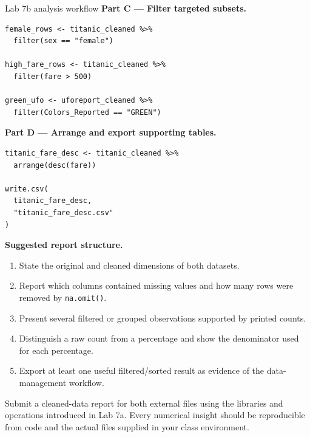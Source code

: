 \begin{labproject}{Lab 7b analysis workflow}
\textbf{Part C --- Filter targeted subsets.}

\begin{lstlisting}[style=dsr]
female_rows <- titanic_cleaned %>%
  filter(sex == "female")

high_fare_rows <- titanic_cleaned %>%
  filter(fare > 500)

green_ufo <- uforeport_cleaned %>%
  filter(Colors_Reported == "GREEN")
\end{lstlisting}

\textbf{Part D --- Arrange and export supporting tables.}

\begin{lstlisting}[style=dsr]
titanic_fare_desc <- titanic_cleaned %>%
  arrange(desc(fare))

write.csv(
  titanic_fare_desc,
  "titanic_fare_desc.csv"
)
\end{lstlisting}

\textbf{Suggested report structure.}
\begin{enumerate}
  \item State the original and cleaned dimensions of both datasets.
  \item Report which columns contained missing values and how many rows were removed by \texttt{na.omit()}.
  \item Present several filtered or grouped observations supported by printed counts.
  \item Distinguish a raw count from a percentage and show the denominator used for each percentage.
  \item Export at least one useful filtered/sorted result as evidence of the data-management workflow.
\end{enumerate}
\end{labproject}

\begin{labdeliverable}
Submit a cleaned-data report for both external files using the libraries and operations introduced in Lab 7a. Every numerical insight should be reproducible from code and the actual files supplied in your class environment.
\end{labdeliverable}
